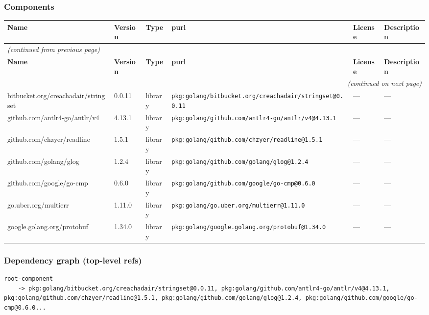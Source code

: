 \documentclass[11pt,a4paper]{article}
\begin{document}
\subsubsection*{Components}
\begin{longtable}{|p{4cm}|p{2cm}|p{1.6cm}|p{5cm}|p{1.5cm}|p{3.5cm}|}
\toprule
\rowcolor{sbomhdr}\textbf{Name} & \textbf{Version} & \textbf{Type} & \textbf{purl} & \textbf{License} & \textbf{Description} \\
\midrule
\endfirsthead
\multicolumn{6}{l}{\small\itshape (continued from previous page)} \\
\toprule
\rowcolor{sbomhdr}\textbf{Name} & \textbf{Version} & \textbf{Type} & \textbf{purl} & \textbf{License} & \textbf{Description} \\
\midrule
\endhead
\midrule
\multicolumn{6}{r}{\small\itshape (continued on next page)} \\
\endfoot
\bottomrule
\endlastfoot
\raggedright bitbucket.org/creachadair/stringset & 0.0.11 & library & \small\texttt{pkg:golang/bitbucket.org/creachadair/stringset@0.0.11} & — & \small — \\
\raggedright github.com/antlr4-go/antlr/v4 & 4.13.1 & library & \small\texttt{pkg:golang/github.com/antlr4-go/antlr/v4@4.13.1} & — & \small — \\
\raggedright github.com/chzyer/readline & 1.5.1 & library & \small\texttt{pkg:golang/github.com/chzyer/readline@1.5.1} & — & \small — \\
\raggedright github.com/golang/glog & 1.2.4 & library & \small\texttt{pkg:golang/github.com/golang/glog@1.2.4} & — & \small — \\
\raggedright github.com/google/go-cmp & 0.6.0 & library & \small\texttt{pkg:golang/github.com/google/go-cmp@0.6.0} & — & \small — \\
\raggedright go.uber.org/multierr & 1.11.0 & library & \small\texttt{pkg:golang/go.uber.org/multierr@1.11.0} & — & \small — \\
\raggedright google.golang.org/protobuf & 1.34.0 & library & \small\texttt{pkg:golang/google.golang.org/protobuf@1.34.0} & — & \small — \\
\end{longtable}

\subsubsection*{Dependency graph (top-level refs)}
\begin{lstlisting}[style=depgraph]
  root-component
    -> pkg:golang/bitbucket.org/creachadair/stringset@0.0.11, pkg:golang/github.com/antlr4-go/antlr/v4@4.13.1, pkg:golang/github.com/chzyer/readline@1.5.1, pkg:golang/github.com/golang/glog@1.2.4, pkg:golang/github.com/google/go-cmp@0.6.0...
\end{lstlisting}
\end{document}
